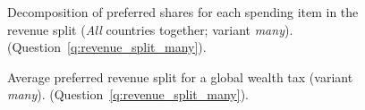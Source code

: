 \begin{figure}[h!]
    \caption[Decomposition of preferred spendings in revenue split]{Decomposition of preferred shares for each spending item in the revenue split (\textit{All} countries together; variant \textit{many}). (Question~\ref{q:revenue_split_many}).
    }\label{fig:split_many}
\end{figure}

\begin{figure}[h!]
    \caption[Average preferred revenue split (\textit{many})]{Average preferred revenue split for a global wealth tax (variant \textit{many}). (Question~\ref{q:revenue_split_many}).
    }\label{fig:split_many_global_mean}
\end{figure} 



